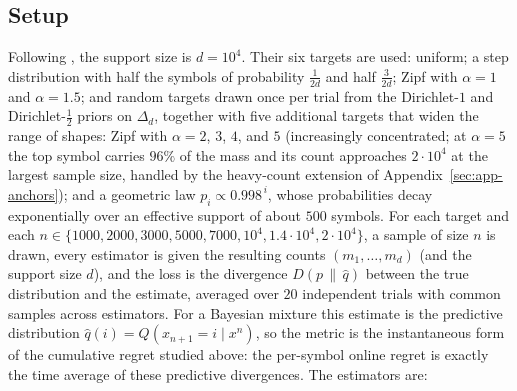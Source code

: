 \documentclass[11pt]{article}
\newcommand{\KL}{D}
\begin{document}
\subsection{Setup}
\label{sec:comparison-setup}
Following \cite{orlitsky2015competitive}, the support size is \(d=10^4\).
Their six targets are used: uniform; a step distribution with half the
symbols of probability \(\tfrac1{2d}\) and half \(\tfrac3{2d}\); Zipf with
\(\alpha=1\) and \(\alpha=1.5\); and random targets drawn once per trial
from the Dirichlet-\(1\) and Dirichlet-\(\tfrac12\) priors on
\(\Delta_d\), together with five additional targets that widen the range
of shapes: Zipf with \(\alpha=2\), \(3\), \(4\), and \(5\) (increasingly
concentrated; at \(\alpha=5\) the top symbol carries \(96\%\) of the mass
and its count approaches \(2\cdot10^4\) at the largest sample size,
handled by the heavy-count extension of
Appendix~\ref{sec:app-anchors}); and a geometric
law \(p_i\propto0.998^{\,i}\), whose probabilities decay exponentially
over an effective support of about \(500\) symbols.
For each target and each
\(n\in\{1000,2000,3000,5000,7000,10^4,1.4\cdot10^4,2\cdot10^4\}\), a sample
of size \(n\) is drawn, every estimator is given the resulting counts
\((m_1,\dots,m_d)\) (and the support size \(d\)), and the loss is the
divergence \(\KL(p\,\|\,\hat q)\) between the true distribution and the
estimate, averaged over \(20\) independent trials with common samples across
estimators.  For a Bayesian mixture this estimate is the predictive
distribution \(\hat q(i)=Q(x_{n+1}=i\mid x^n)\), so the metric is the
instantaneous form of the cumulative regret studied above: the per-symbol
online regret is exactly the time average of these predictive divergences.
The estimators are:
\end{document}
